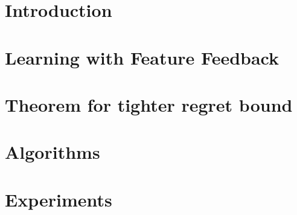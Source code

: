 \documentclass[twoside]{article}
\newcommand{\1}[1]{\ensuremath{{\d1}{\left\{#1\right\}}}}
\begin{document}
%

%


\begin{abstract}
\end{abstract}

\section{Introduction}\label{sec:intro}


\section{Learning with Feature Feedback}\label{sec:ff}


\section{Theorem for tighter regret bound}\label{sec:theory}


\section{Algorithms}\label{sec:algo}


\section{Experiments}\label{sec:exp}

\end{document}
